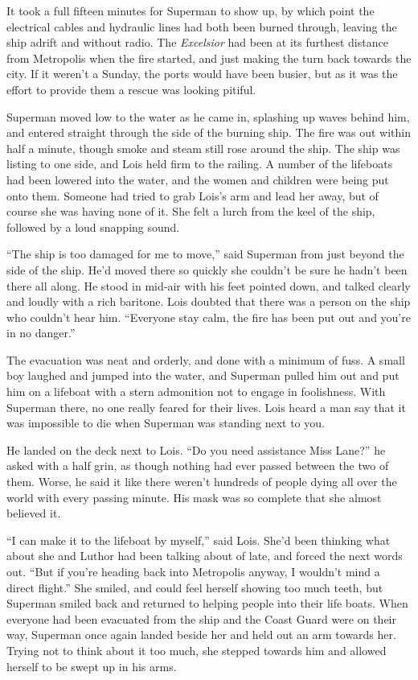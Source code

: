 It took a full fifteen minutes for Superman to show up, by which point
the electrical cables and hydraulic lines had both been burned through,
leaving the ship adrift and without radio. The \emph{Excelsior} had been
at its furthest distance from Metropolis when the fire started, and just
making the turn back towards the city. If it weren't a Sunday, the ports
would have been busier, but as it was the effort to provide them a
rescue was looking pitiful.

Superman moved low to the water as he came in, splashing up waves behind
him, and entered straight through the side of the burning ship. The fire
was out within half a minute, though smoke and steam still rose around
the ship. The ship was listing to one side, and Lois held firm to the
railing. A number of the lifeboats had been lowered into the water, and
the women and children were being put onto them. Someone had tried to
grab Lois's arm and lead her away, but of course she was having none of
it. She felt a lurch from the keel of the ship, followed by a loud
snapping sound.

``The ship is too damaged for me to move,'' said Superman from just
beyond the side of the ship. He'd moved there so quickly she couldn't be
sure he hadn't been there all along. He stood in mid‐air with his feet
pointed down, and talked clearly and loudly with a rich baritone. Lois
doubted that there was a person on the ship who couldn't hear him.
``Everyone stay calm, the fire has been put out and you're in no
danger.''

The evacuation was neat and orderly, and done with a minimum of fuss. A
small boy laughed and jumped into the water, and Superman pulled him out
and put him on a lifeboat with a stern admonition not to engage in
foolishness. With Superman there, no one really feared for their lives.
Lois heard a man say that it was impossible to die when Superman was
standing next to you.

He landed on the deck next to Lois. ``Do you need assistance Miss
Lane?'' he asked with a half grin, as though nothing had ever passed
between the two of them. Worse, he said it like there weren't hundreds
of people dying all over the world with every passing minute. His mask
was so complete that she almost believed it.

``I can make it to the lifeboat by myself,'' said Lois. She'd been
thinking what about she and Luthor had been talking about of late, and
forced the next words out. ``But if you're heading back into Metropolis
anyway, I wouldn't mind a direct flight.'' She smiled, and could feel
herself showing too much teeth, but Superman smiled back and returned to
helping people into their life boats. When everyone had been evacuated
from the ship and the Coast Guard were on their way, Superman once again
landed beside her and held out an arm towards her. Trying not to think
about it too much, she stepped towards him and allowed herself to be
swept up in his arms.

